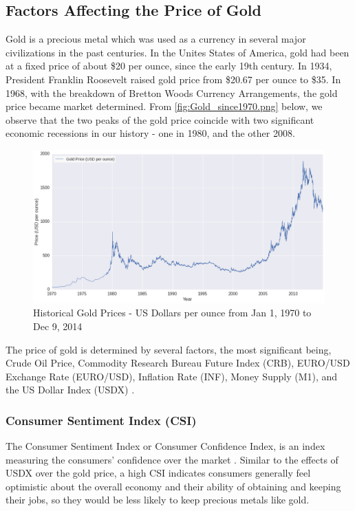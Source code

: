 \documentclass[runningheads]{llncs}
\begin{document}
\subsection{Factors Affecting the Price of Gold}
Gold is a precious metal which was used as a currency in several major civilizations in the past centuries. In the Unites States of America, gold had been at a fixed price of about \$20 per ounce, since the early 19th century. In 1934, President Franklin Roosevelt raised gold price from \$20.67 per ounce to \$35. In 1968, with the breakdown of Bretton Woods Currency Arrangements, the gold price became market determined. From \autoref{fig:Gold_since1970.png} below, we observe that the two peaks of the gold price coincide with two significant economic recessions in our history - one in 1980, and the other 2008.\\

\begin{figure}
\centering
\includegraphics[width=\textwidth]{Gold_since1970.png}
\caption{Historical Gold Prices - US Dollars per ounce from Jan 1, 1970 to Dec 9, 2014}
\label{fig:Gold_since1970.png}
\end{figure}

\noindent The price of gold is determined by several factors, the most significant being, Crude Oil Price, Commodity Research Bureau Future Index (CRB), EURO/USD Exchange Rate (EURO/USD), Inflation Rate (INF), Money Supply (M1), and the US Dollar Index (USDX) \cite{gold-shafiee}\cite{gold-zhang}\cite{gold-Ismail}. 

\subsubsection{Consumer Sentiment Index (CSI)} 
The Consumer Sentiment Index or Consumer Confidence Index, is an index measuring the consumers' confidence over the market \cite{csi-1}\cite{csi-2}. Similar to the effects of USDX over the gold price, a high CSI indicates consumers generally feel optimistic about the overall economy and their ability of obtaining and keeping their jobs, so they would be less likely to keep precious metals like gold.
\end{document}
